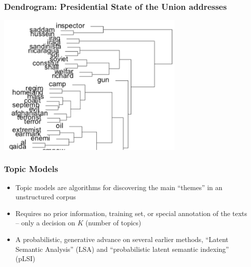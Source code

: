\documentclass{beamer}
\begin{document}
\begin{frame}
	\frametitle{Dendrogram: Presidential State of the Union addresses}
	\begin{center}
		\includegraphics[height=7cm]{figures/dendrogram2.png}
	\end{center}
\end{frame}


\begin{frame}
	\frametitle{Topic Models}
	\begin{itemize}
		\item Topic models are algorithms for discovering the main
		``themes'' in an unstructured corpus
		\item Requires no prior information, training set, or special
		annotation of the texts \newline -- only a decision on $K$ (number of topics)
		\item A probabilistic, generative advance on several earlier
		methods, ``Latent Semantic Analysis'' (LSA) and ``probabilistic latent
		semantic indexing'' (pLSI)
	\end{itemize}
\end{frame}
\end{document}
